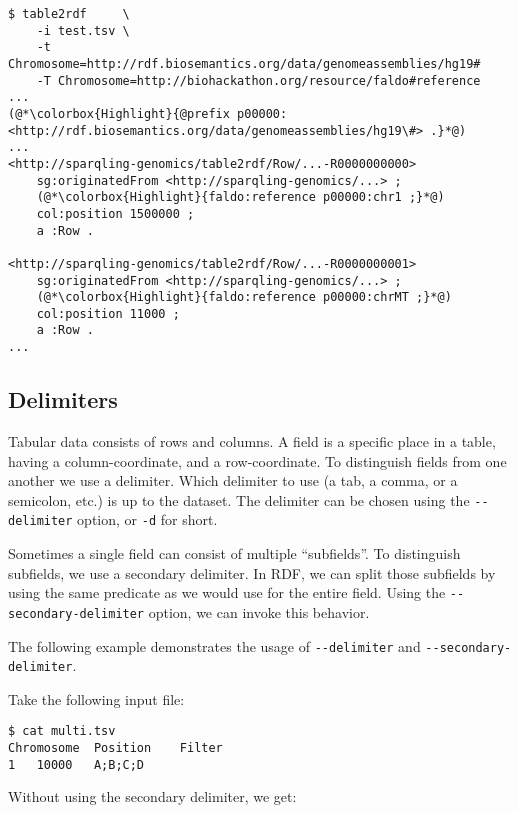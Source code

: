 \begin{siderules}
\begin{lstlisting}
$ table2rdf     \
    -i test.tsv \
    -t Chromosome=http://rdf.biosemantics.org/data/genomeassemblies/hg19#
    -T Chromosome=http://biohackathon.org/resource/faldo#reference
...
(@*\colorbox{Highlight}{@prefix p00000: <http://rdf.biosemantics.org/data/genomeassemblies/hg19\#> .}*@)
...
<http://sparqling-genomics/table2rdf/Row/...-R0000000000>
    sg:originatedFrom <http://sparqling-genomics/...> ;
    (@*\colorbox{Highlight}{faldo:reference p00000:chr1 ;}*@)
    col:position 1500000 ;
    a :Row .

<http://sparqling-genomics/table2rdf/Row/...-R0000000001>
    sg:originatedFrom <http://sparqling-genomics/...> ;
    (@*\colorbox{Highlight}{faldo:reference p00000:chrMT ;}*@)
    col:position 11000 ;
    a :Row .
...
\end{lstlisting}
\end{siderules}

\subsection{Delimiters}

  Tabular data consists of rows and columns.  A field is a specific place in
  a table, having a column-coordinate, and a row-coordinate.  To distinguish
  fields from one another we use a delimiter.  Which delimiter to use (a tab,
  a comma, or a semicolon, etc.) is up to the dataset.  The delimiter
  can be chosen using the \texttt{-{}-delimiter} option, or \texttt{-d} for
  short.

  Sometimes a single field can consist of multiple ``subfields''.  To
  distinguish subfields, we use a secondary delimiter.  In RDF, we can split
  those subfields by using the same predicate as we would use for the entire
  field.  Using the \texttt{-{}-secondary-delimiter} option, we can invoke
  this behavior.

  The following example demonstrates the usage of \texttt{-{}-delimiter} and
  \texttt{-{}-secondary-delimiter}.

  Take the following input file:
\begin{siderules}
\begin{verbatim}
$ cat multi.tsv
Chromosome	Position	Filter
1	10000	A;B;C;D
\end{verbatim}
\end{siderules}

  Without using the secondary delimiter, we get:

